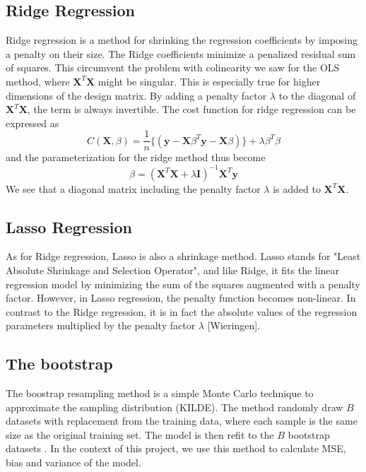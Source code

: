 \documentclass{article}
\begin{document}
\subsection{Ridge Regression}
Ridge regression is a method for shrinking the regression coefficients by imposing a penalty on their size. The Ridge coefficients minimize a penalized residual sum of squares. This circumvent the problem with colinearity we saw for the OLS method, where $\textbf{X}^{T}\textbf{X}$ might be singular. This is especially true for higher dimensions of the design matrix. By adding a penalty factor $\lambda$ to the diagonal of $\textbf{X}^{T}\textbf{X}$, the term is always invertible. The cost function for ridge regression can be expressed as
\begin{equation}
C(\textbf{X},\beta) = \dfrac{1}{n} \{( \textbf{y}-\textbf{X}\beta^{T}\textbf{y}-\textbf{X}\beta)\} + \lambda \beta^{T} \beta 
\end{equation}
and the parameterization for the ridge method thus become
\begin{equation}
\beta = (\textbf{X}^{T}\textbf{X} + \lambda\textbf{I})^{-1}\textbf{X}^{T}\textbf{y}
\end{equation}
We see that a diagonal matrix including the penalty factor $\lambda$ is added to $\textbf{X}^{T}\textbf{X}$. 
\subsection{Lasso Regression}
As for Ridge regression, Lasso is also a shrinkage method. Lasso stands for "Least Absolute Shrinkage and Selection Operator", and like Ridge, it fits the linear regression model by minimizing the sum of the squares augmented with a penalty factor. However, in Lasso regression, the penalty function becomes non-linear. In contrast to the Ridge regression, it is in fact the absolute values of the regression parameters multiplied by the penalty factor $\lambda$ [Wieringen].
\subsection{The bootstrap}
The boostrap resampling method is a simple Monte Carlo technique to approximate the sampling distribution (KILDE). The method randomly draw $B$ datasets with replacement from the training data, where each sample is the same size as the original training set. The model is then refit to the $B$ bootstrap datasets \cite{1}. In the context of this project, we use this method to calculate MSE, bias and variance of the model.
\end{document}
